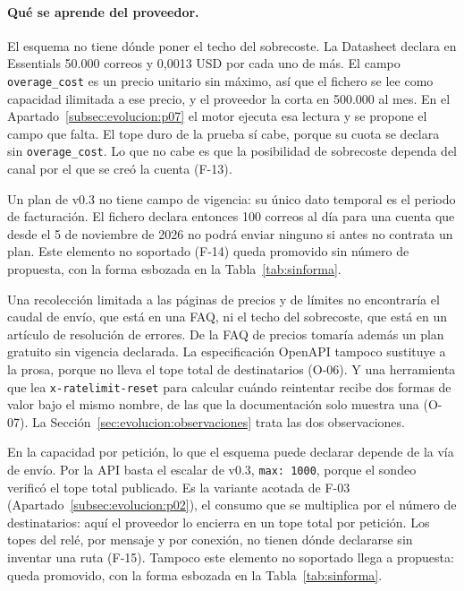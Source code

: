 \paragraph{Qué se aprende del proveedor.} El esquema no tiene dónde poner el
techo del sobrecoste. La Datasheet declara en Essentials 50.000 correos y
0,0013 USD por cada uno de más. El campo \texttt{overage\_cost} es un precio
unitario sin máximo, así que el fichero se lee como capacidad ilimitada a ese
precio, y el proveedor la corta en 500.000 al mes. En el
Apartado~\ref{subsec:evolucion:p07} el motor ejecuta esa lectura y se propone
el campo que falta. El tope duro de la prueba sí cabe, porque su cuota se
declara sin \texttt{overage\_cost}. Lo que no cabe es que la posibilidad de
sobrecoste dependa del canal por el que se creó la cuenta (F-13).

Un plan de v0.3 no tiene campo de vigencia: su único dato temporal es el
periodo de facturación. El fichero declara entonces 100 correos al día para
una cuenta que desde el 5 de noviembre de 2026 no podrá enviar ninguno si antes no
contrata un plan. Este elemento no soportado (F-14) queda promovido sin número de
propuesta, con la forma esbozada en la Tabla~\ref{tab:sinforma}.

Una recolección limitada a las páginas de precios y de límites no encontraría
el caudal de envío, que está en una FAQ, ni el techo del sobrecoste, que está
en un artículo de resolución de errores. De la FAQ de precios tomaría además
un plan gratuito sin vigencia declarada. La especificación OpenAPI tampoco
sustituye a la prosa, porque no lleva el tope total de destinatarios (O-06). Y
una herramienta que lea \texttt{x-ratelimit-reset} para calcular cuándo
reintentar recibe dos formas de valor bajo el mismo nombre, de las que la
documentación solo muestra una (O-07). La
Sección~\ref{sec:evolucion:observaciones} trata las dos observaciones.

En la capacidad por petición, lo que el esquema puede declarar depende de la
vía de envío. Por la API basta el escalar de v0.3, \texttt{max: 1000}, porque
el sondeo verificó el tope total publicado. Es la variante acotada de F-03 (Apartado~\ref{subsec:evolucion:p02}), el
consumo que se multiplica por el número de destinatarios: aquí el proveedor lo
encierra en un tope total por petición. Los topes del relé, por mensaje y por
conexión, no tienen dónde declararse sin inventar una ruta (F-15). Tampoco
este elemento no soportado llega a propuesta: queda promovido, con la forma esbozada
en la Tabla~\ref{tab:sinforma}.

